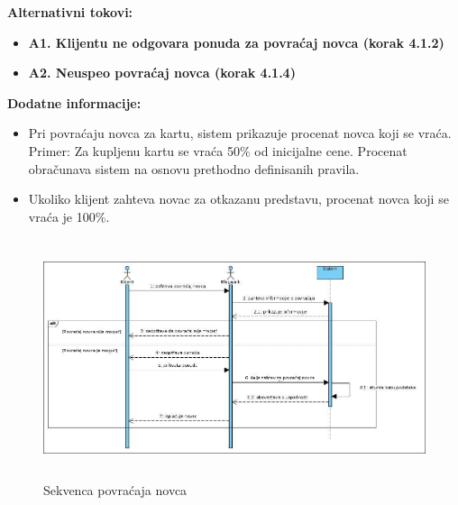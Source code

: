 \documentclass[a4paper]{article}
\begin{document}
  \noindent\textbf{Alternativni tokovi:} 
  \begin{itemize}
    \item \textbf{A1. Klijentu ne odgovara ponuda za povraćaj novca (korak 4.1.2)} 
    \item \textbf{A2. Neuspeo povraćaj novca (korak 4.1.4)} 
  \end{itemize}

  \noindent\textbf{Dodatne informacije:} 
  \begin{itemize}
    \item Pri povraćaju novca za kartu, sistem prikazuje procenat novca
  koji se vraća. Primer: Za kupljenu kartu se vraća 50\% od inicijalne cene. Procenat obračunava sistem
  na osnovu prethodno definisanih pravila.
    \item Ukoliko klijent zahteva novac za otkazanu predstavu, procenat novca koji se vraća je 100\%.
  \end{itemize}

  \begin{figure}[H]
    \begin{center}
        \includegraphics[width=120mm,height=70mm]{../images/sequence_povracaj_novca.jpg}
    \end{center}
    \caption{Sekvenca povraćaja novca}
    \label{sequence_povracaj novca}
  \end{figure}
\end{document}
